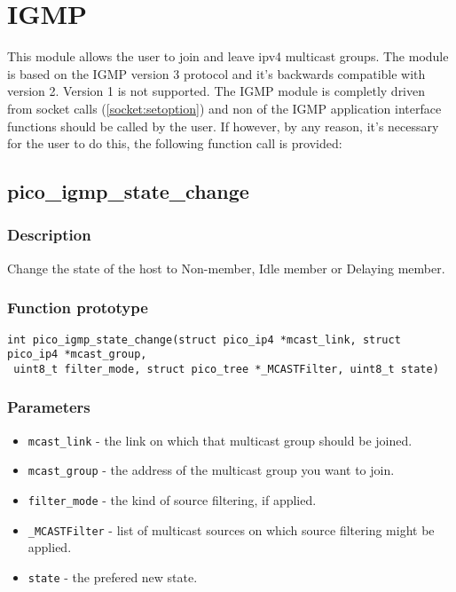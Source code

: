 \section{IGMP}

This module allows the user to join and leave ipv4 multicast groups. The module is based on the IGMP version 3 protocol and it's backwards compatible with version 2. Version 1 is not supported. 
The IGMP module is completly driven from socket calls (\ref{socket:setoption}) and non of the IGMP application interface functions should be called by the user. If however, by any reason, it's necessary for the user to do this, the following function call is provided:

\subsection{pico\_igmp\_state\_change}

\subsubsection*{Description}
Change the state of the host to Non-member, Idle member or Delaying member.

\subsubsection*{Function prototype}
\begin{verbatim}
int pico_igmp_state_change(struct pico_ip4 *mcast_link, struct pico_ip4 *mcast_group,
 uint8_t filter_mode, struct pico_tree *_MCASTFilter, uint8_t state)
\end{verbatim}

\subsubsection*{Parameters}
\begin{itemize}[noitemsep]
\item \texttt{mcast\_link} - the link on which that multicast group should be joined.
\item \texttt{mcast\_group} - the address of the multicast group you want to join.
\item \texttt{filter\_mode} - the kind of source filtering, if applied.
\item \texttt{\_MCASTFilter} - list of multicast sources on which source filtering might be applied. 
\item \texttt{state} - the prefered new state.
\end{itemize}

